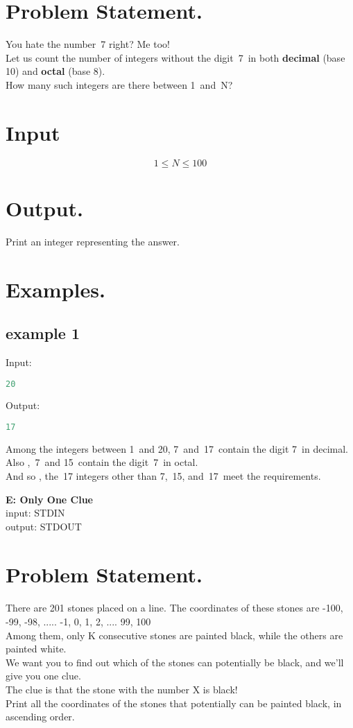 \documentclass[10pt]{article}
\begin{document}
\section{Problem Statement.}
You hate the number 7 right? Me too!\\
Let us count the number of integers without the digit 7 in both \textbf{decimal} (base 10) and \textbf{octal} (base 8).\\
How many such integers are there between 1 and N?
\section{Input}
$$ 1\le N \le 100 $$
\section{Output.}
Print an integer representing the answer.
\section{Examples.}
\subsection{example 1}
Input:
\begin{lstlisting}[language=Python]
20
\end{lstlisting}
Output:
\begin{lstlisting}[language=Python]
17
\end{lstlisting}
Among the integers between 1 and 20, 7 and 17 contain the digit 7 in decimal. Also , 7 and 15 contain the digit 7 in octal.\\
And so , the 17 integers other than 7, 15, and 17 meet the requirements.
\newpage
\begin{center}
    \Huge { \textbf{E: Only One Clue}}\\
    \normalsize  { input:  STDIN}\\
    \normalsize{    output: STDOUT}
\end{center}
\section{Problem Statement.}
\paragraph{}
There are 201 stones placed on a line. The coordinates of these stones are -100, -99, -98, ..... -1, 0, 1, 2, .... 99, 100\\
Among them, only K consecutive stones are painted black, while the others are painted white.\\
We want you to find out which of the stones can potentially be black, and we’ll give you one clue.\\
The clue is that the stone with the number X is black!\\
Print all the coordinates of the stones that potentially can be painted black, in ascending order.
\end{document}

